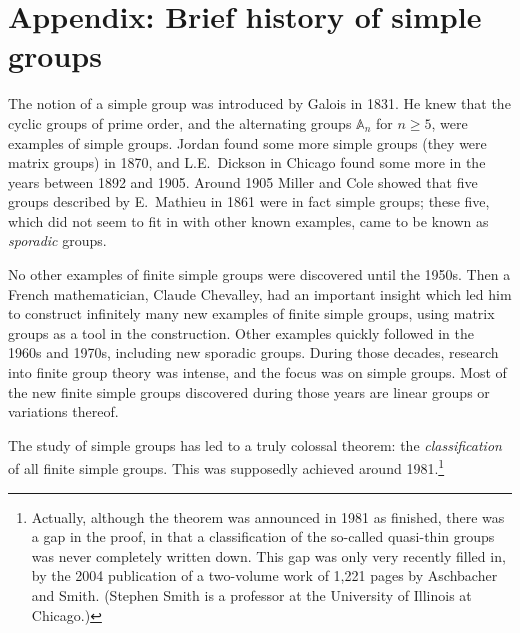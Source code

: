 \documentclass[11pt,oneside]{article}
\theoremstyle{definition}
\newcommand{\Alt}{\mathbb{A}}
\begin{document}
\newpage
\setcounter{section}{1}
\renewcommand{\thesection}{\Alph{section}}
\section{Appendix: Brief history of simple groups}\noindent
The notion of a simple group was introduced by Galois in 1831.  He
knew that the cyclic groups of prime order, and the alternating groups
$\Alt_n$ for $n\ge 5$, were examples of simple groups. Jordan found
some more simple groups (they were matrix groups) in 1870, and
L.E.\ Dickson in Chicago found some more in the years between 1892 and
1905. Around 1905 Miller and Cole showed that five groups described by
E.\ Mathieu in 1861 were in fact simple groups; these five, which did
not seem to fit in with other known examples, came to be known as {\em
  sporadic} groups.

No other examples of finite simple groups were discovered until the
1950s.  Then a French mathematician, Claude Chevalley, had an
important insight which led him to construct infinitely many new
examples of finite simple groups, using matrix groups as a tool in the
construction. Other examples quickly followed in the 1960s and 1970s,
including new sporadic groups. During those decades, research into
finite group theory was intense, and the focus was on simple
groups. Most of the new finite simple groups discovered during those
years are linear groups or variations thereof.

The study of simple groups has led to a truly colossal theorem: the
{\em classification} of all finite simple groups. This was supposedly
achieved around 1981.\footnote{Actually, although the theorem was
  announced in 1981 as finished, there was a gap in the proof, in that
  a classification of the so-called quasi-thin groups was never
  completely written down.  This gap was only very recently filled in,
  by the 2004 publication of a two-volume work of 1,221 pages by
  Aschbacher and Smith. (Stephen Smith is a professor at the
  University of Illinois at Chicago.)}  
\end{document}
